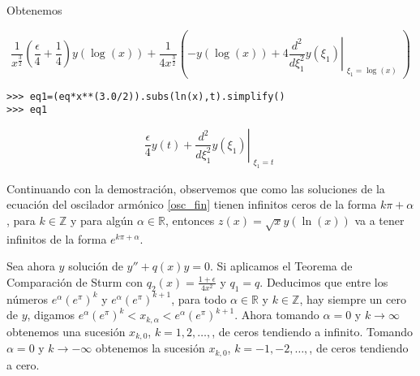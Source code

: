 \begin{demo}
Obtenemos

\[
\frac{1}{x^{\frac{3}{2}}} \left(\frac{\epsilon}{4} + \frac{1}{4}\right) y{\left (\log{\left (x \right )} \right )} + \frac{1}{4 x^{\frac{3}{2}}} \left(- y{\left (\log{\left (x \right )} \right )} + 4 \left. \frac{d^{2}}{d \xi_{1}^{2}}  y{\left (\xi_{1} \right )} \right|_{\substack{ \xi_{1}=\log{\left (x \right )} }}\right)
\]

\begin{lstlisting}
>>> eq1=(eq*x**(3.0/2)).subs(ln(x),t).simplify() 
>>> eq1
\end{lstlisting}

\[\frac{\epsilon}{4} y{\left (t \right )} + \left. \frac{d^{2}}{d \xi_{1}^{2}}  y{\left (
\xi_{1} \right )} \right|_{\substack{ \xi_{1}=t }}\]

Continuando con la demostración, observemos que como las soluciones de la ecuación del oscilador armónico \eqref{osc_fin} tienen infinitos ceros de la forma $k\pi+\alpha$, para $k\in\mathbb{Z}$ y para algún $\alpha\in\mathbb{R}$, entonces $z(x)=\sqrt{x}y(\ln(x))$ va a tener infinitos
de la forma $e^{k\pi+\alpha}$. 

Sea ahora $y$ solución de $y''+q(x)y=0$. Si aplicamos el Teorema de Comparación de Sturm con $q_2(x)=\frac{1+\epsilon}{4x^2}$ y $q_1=q$. Deducimos que entre los números  $e^{\alpha}(e^{\pi})^k$ y $e^{\alpha}(e^{\pi})^{k+1}$, para todo $\alpha\in\mathbb{R}$ y $k\in\mathbb{Z}$, hay siempre un cero de $y$, digamos  $e^{\alpha}(e^{\pi})^k<x_{k,\alpha}<e^{\alpha}(e^{\pi})^{k+1}$. Ahora tomando $\alpha=0$ y $k\to\infty$ obtenemos una sucesión $x_{k,0}$, $k=1,2,\ldots,$, de ceros tendiendo a infinito. Tomando $\alpha=0$ y   $k\to-\infty$ obtenemos la sucesión $x_{k,0}$, $k=-1,-2,\ldots,$, de ceros tendiendo a cero.
\end{demo}

